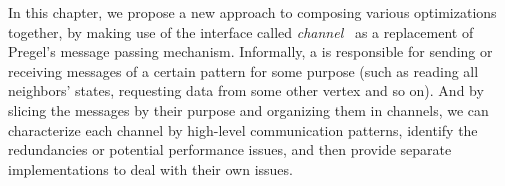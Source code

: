 \documentclass{sokendai_thesis} %
\begin{document}

In this chapter, we propose a new approach to composing various optimizations together, by making use of the interface called {\em channel}~\cite{husky} as a replacement of Pregel's message passing mechanism.
Informally, a  is responsible for sending or receiving messages of a certain pattern for some purpose (such as reading all neighbors' states, requesting data from some other vertex and so on).
And by slicing the messages by their purpose and organizing them in channels, we can characterize each channel by high-level communication patterns, identify the redundancies or potential performance issues, and then provide separate implementations to deal with their own issues.
\end{document}
